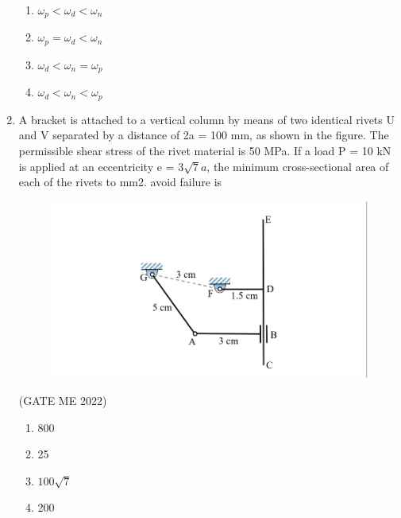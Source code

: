 \documentclass[journal]{IEEEtran}
\numberwithin{equation}{enumi}
\numberwithin{figure}{enumi}
\begin{document}
\begin{enumerate}
\begin{enumerate}
    \item $\omega_p < \omega_d < \omega_n$
    \item $\omega_p = \omega_d < \omega_n$
    \item $\omega_d < \omega_n = \omega_p$
    \item $\omega_d < \omega_n < \omega_p$
\end{enumerate}

\item A bracket is attached to a vertical column by means of two identical rivets U and V separated by a distance of 2a = 100 mm, as shown in the figure. The permissible shear stress of the rivet material is 50 MPa. If a load P = 10 kN is applied at an eccentricity e = 3$\sqrt{7} a$, the minimum cross-sectional area of each of the rivets to
mm2. avoid failure is
 \begin{figure}[H]
    \centering
    \includegraphics[width = 0.5\columnwidth]{figs/fig4.12.png}
    \caption*{}
    \label{fig:Q40}
    \end{figure}
    \hfill{(GATE ME 2022)}
    \begin{multicols}{4}
        \begin{enumerate}
            \item 800
            \item 25
            \item $100\sqrt{7}$
\item 200


\end{enumerate}
\end{multicols}
\end{enumerate}
\end{document}
